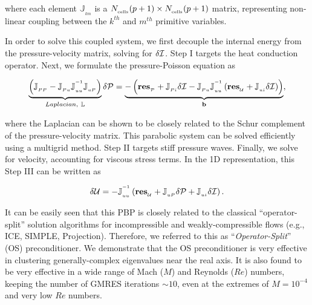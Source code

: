 \documentclass{report}
\begin{document}
\noindent where each element $\mathbb{J}_{_{km}} $ is a $N_{_{\rm cells}}
(p+1)\times N_{_{\rm cells}}(p+1) $ matrix, representing non-linear
coupling between the $k^{th}$ and $m^{th}$ primitive variables.

In order to solve this coupled system, we first decouple the internal
energy from the pressure-velocity matrix, solving for $\delta {\cal I} $.
Step I targets the heat conduction operator. Next, we formulate the
pressure-Poisson equation as

\[ \underbrace{\left( \mathbb{J}_{_{PP}}- \mathbb{J}_{_{Pu}}
\mathbb{J}_{_{uu}}^{^{-1}}\mathbb{J}_{_{uP}}
\right)}_{Laplacian,~\mathbb{L}} \delta {\cal P} = \underbrace{-\left(
{\bf res}_{_{\cal P}}+\mathbb{J}_{_{Pi}} \delta {\cal
I}-\mathbb{J}_{_{Pu}} \mathbb{J}_{_{uu}}^{^{-1}} \left( {\bf res}_{_{\cal
U}} +\mathbb{J}_{_{ui}} \delta {\cal I} \right) \right)} _{\bf b}, \]

\noindent where the Laplacian can be shown to be closely related to the
Schur complement of the pressure-velocity matrix. This parabolic system
can be solved efficiently using a multigrid method. Step II targets stiff
pressure waves. Finally, we solve for velocity, accounting for viscous
stress terms. In the 1D representation, this Step III can be written as

\[ \delta {\cal U} =- \mathbb{J}_{_{uu}}^{^{-1}} \left({\bf res}_{_{\cal
U}} + \mathbb{J}_{_{uP}} \delta {\cal P}+ \mathbb{J}_{_{ui}} \delta {\cal
I} \right) . \]

It can be easily seen that this PBP is closely related to the classical
``operator-split'' solution algorithms for incompressible and
weakly-compressible flows (e.g., ICE, SIMPLE, Projection). Therefore, we
referred to this as ``\textit{Operator-Split}'' (OS) preconditioner. We
demonstrate that the OS preconditioner is very effective in clustering
generally-complex eigenvalues near the real axis. It is also found to be
very effective in a wide range of Mach ($M$) and Reynolds ($Re$) numbers,
keeping the number of GMRES iterations $\sim10$, even at the extremes of
$M=10^{-4}$ and very low $Re$ numbers.
\end{document}

